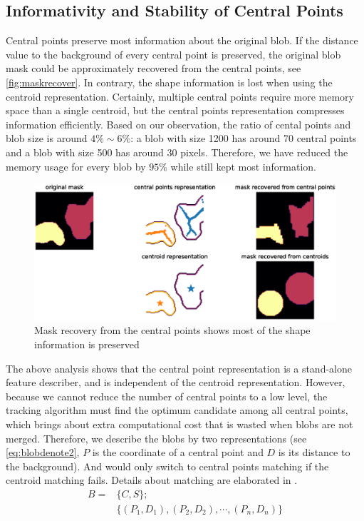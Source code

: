 \subsection{Informativity and Stability of Central Points}
Central points preserve most information about the original blob. If the distance value to the background of every central point is preserved, the original blob mask could be approximately recovered from the central points, see \autoref{fig:maskrecover}. In contrary, the shape information is lost when using the centroid representation. Certainly, multiple central points require more memory space than a single centroid, but the central points representation compresses information efficiently. Based on our observation, the ratio of cental points and blob size is around $4\%\sim6\%$: a blob with size 1200 has around 70 central points and a blob with size 500 has around 30 pixels. Therefore, we have reduced the memory usage for every blob by $95\%$ while still kept most information.
\begin{figure}
  \centering
  \includegraphics[width=\textwidth]{figures/maskrecover.eps}
  \caption{Mask recovery from the central points shows most of the shape information is preserved}\label{fig:maskrecover}
\end{figure}

The above analysis shows that the central point representation is a stand-alone feature describer, and is independent of the centroid representation. However, because we cannot reduce the number of central points to a low level, the tracking algorithm must find the optimum candidate among all central points, which brings about extra computational cost that is wasted when blobs are not merged. Therefore, we describe the blobs by two representations (see \autoref{eq:blobdenote2}, $P$ is the coordinate of a central point and $D$ is its distance to the background). And would only switch to central points matching if the centroid matching fails. Details about matching are elaborated in .
\begin{equation}\label{eq:blobdenote2}
  \begin{split}
        B = &\{C,S\}; \\
        &\{(P_1,D_1),(P_2,D_2),\cdots,(P_n,D_n)\}
      \end{split}
\end{equation}

